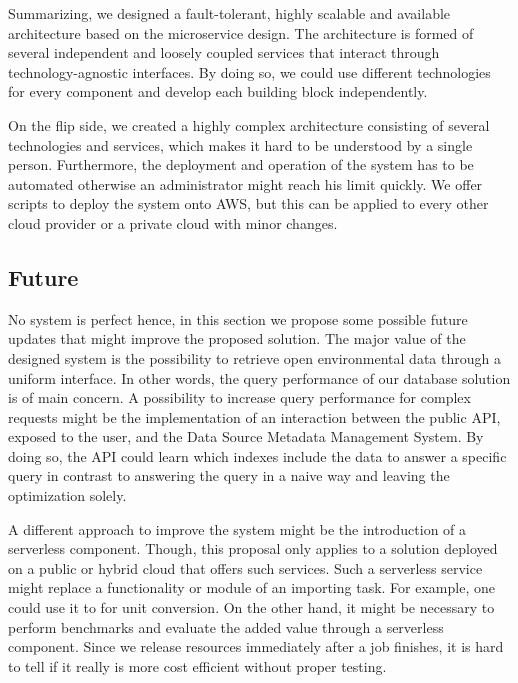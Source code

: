 Summarizing, we designed a fault-tolerant, highly scalable and available
architecture based on the microservice design. The architecture is
formed of several independent and loosely coupled services that interact
through technology-agnostic interfaces. By doing so, we could use
different technologies for every component and develop each building
block independently.

On the flip side, we created a highly complex architecture consisting of
several technologies and services, which makes it hard to be understood
by a single person. Furthermore, the deployment and operation of the
system has to be automated otherwise an administrator might reach his
limit quickly. We offer scripts to deploy the system onto AWS, but this
can be applied to every other cloud provider or a private cloud with
minor changes.

\subsection{Future}\label{future}

No system is perfect hence, in this section we propose some possible
future updates that might improve the proposed solution. The major value
of the designed system is the possibility to retrieve open environmental
data through a uniform interface. In other words, the query performance
of our database solution is of main concern. A possibility to increase
query performance for complex requests might be the implementation of an
interaction between the public API, exposed to the user, and the Data
Source Metadata Management System. By doing so, the API could learn
which indexes include the data to answer a specific query in contrast to
answering the query in a naive way and leaving the optimization solely.

A different approach to improve the system might be the introduction of
a serverless component. Though, this proposal only applies to a solution
deployed on a public or hybrid cloud that offers such services. Such a
serverless service might replace a functionality or module of an
importing task. For example, one could use it to for unit conversion. On
the other hand, it might be necessary to perform benchmarks and evaluate
the added value through a serverless component. Since we release
resources immediately after a job finishes, it is hard to tell if it
really is more cost efficient without proper testing.
